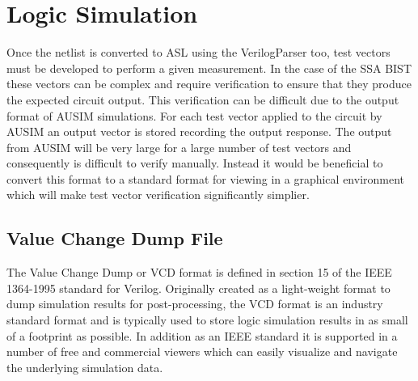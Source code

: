\documentclass[12pt]{report}
\begin{document}
\section{Logic Simulation}
Once the netlist is converted to ASL using the VerilogParser too, test vectors must be developed to perform a given measurement.  In the case of the SSA BIST these vectors can be complex and require verification to ensure that they produce the expected circuit output.  This verification can be difficult due to the output format of AUSIM simulations. For each test vector applied to the circuit by AUSIM an output vector is stored recording the output response.  The output from AUSIM will be very large for a large number of test vectors and consequently is difficult to verify manually.  Instead it would be beneficial to convert this format to a standard format for viewing in a graphical environment which will make test vector verification significantly simplier.

\subsection{Value Change Dump File}
The Value Change Dump or VCD format is defined in section 15 of the IEEE 1364-1995 standard for Verilog\cite{verilog}.  Originally created as a light-weight format to dump simulation results for post-processing\cite{verilog}, the VCD format is an industry standard format and is typically used to store logic simulation results in as small of a footprint as possible\cite{verilog}.  In addition as an IEEE standard it is supported in a number of free and commercial viewers which can easily visualize and navigate the underlying simulation data. 
\end{document}
